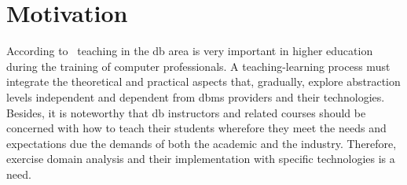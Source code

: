 \section{Motivation}

According to~\cite{Rashid:2014, Salgado:1995} teaching in the \ac{db} area is very important in higher education during the training of computer professionals.
A teaching-learning process must integrate the theoretical and practical aspects that, gradually, explore abstraction levels independent and dependent from \ac{dbms} providers and their technologies.
Besides, it is noteworthy that \ac{db} instructors and related courses should be concerned with how to teach their students 
wherefore they meet the needs and expectations due the demands of both the academic and the industry. Therefore, exercise domain analysis and their implementation with specific technologies is a need. 

